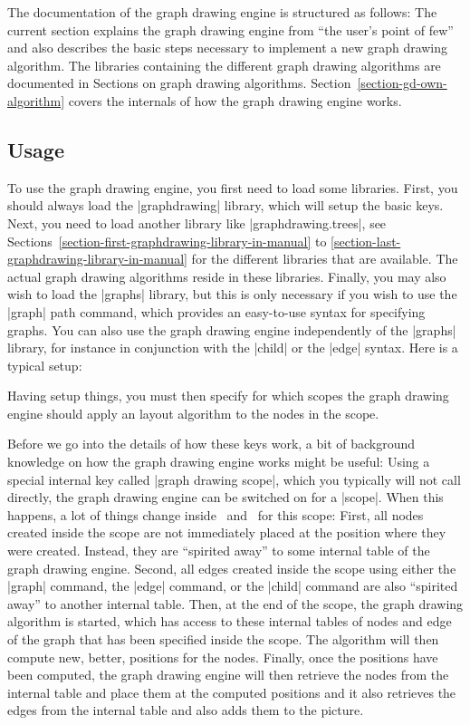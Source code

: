 The documentation of the graph drawing engine is structured as
follows: The current section explains the graph drawing engine from
``the user's point of few'' and also describes the basic steps
necessary to implement a new graph drawing algorithm. The libraries
containing the different graph drawing algorithms are documented in
Sections on graph drawing
algorithms. Section~\ref{section-gd-own-algorithm} covers the
internals of how the graph drawing engine works. 


\subsection{Usage}

To use the graph drawing engine, you first need to load some
libraries. First, you should always load the |graphdrawing| library,
which will setup the basic keys. Next, you need to load another
library like |graphdrawing.trees|, see
Sections~\ref{section-first-graphdrawing-library-in-manual} to
\ref{section-last-graphdrawing-library-in-manual} for the different
libraries that are available. The actual graph drawing
algorithms reside in these libraries. Finally, you may also wish to
load the |graphs| library, but this is only necessary if you wish to
use the |graph| path command, which provides an easy-to-use syntax for
specifying graphs. You can also use the graph drawing engine
independently of the |graphs| library, for instance in conjunction
with the |child| or the |edge| syntax. Here is a typical setup:

\begin{codeexample}
\usetikzlibrary{graphs,graphdrawing,graphdrawing.trees}  
\end{codeexample}

Having setup things, you must then specify for which scopes the
graph drawing engine should apply an layout algorithm to the nodes in
the scope.

Before we go into the details of how these keys work, a bit of
background knowledge on how the graph drawing engine works might be
useful: Using a special internal key called
|graph drawing scope|, which you typically will not call directly,
the graph drawing engine can be switched on for a |{scope}|. When this
happens, a lot of things change inside \pgfname\ and \tikzname\ for
this scope: First, all nodes created inside the scope are not
immediately placed at the position where they were created. Instead,
they are ``spirited away'' to some internal table of the graph drawing
engine. Second, all edges created inside the scope using either the
|graph| command, the |edge| command, or the |child| command are also
``spirited away'' to another internal table. Then, at the end of the
scope, the graph drawing algorithm is started, which has access to
these internal tables of nodes and edge of the graph that has been
specified inside the scope. The algorithm will then compute new,
better, positions for the nodes. Finally, once the positions have been
computed, the graph drawing engine will then retrieve the nodes from
the internal table and place them at the computed positions and it
also retrieves the edges from the internal table and also adds them to
the picture.

